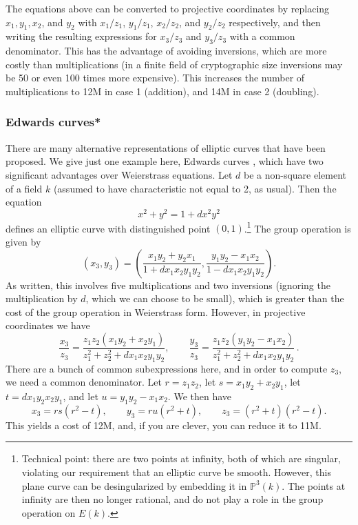 The equations above can be converted to projective coordinates by replacing $x_1,y_1,x_2$, and $y_2$ with
$x_1/z_1$, $y_1/z_1$, $x_2/z_2$, and $y_2/z_2$ respectively, and then writing the resulting expressions for $x_3/z_3$ and $y_3/z_3$ with a common denominator.
This has the advantage of avoiding inversions, which are more costly than multiplications (in a finite field of cryptographic size inversions may be 50 or even 100 times more expensive).
This increases the number of multiplications to 12M in case 1
(addition), and 14M in case 2 (doubling).

\subsubsection{Edwards curves*}
There are many alternative representations of elliptic curves that have been proposed.
We give just one example here, Edwards curves \cite{bl,edwards}, which have two significant advantages over Weierstrass equations.
Let $d$ be a non-square element of a field $k$ (assumed to have characteristic not equal to 2, as usual).
Then the equation
\begin{equation*}
x^2+y^2 = 1+dx^2y^2
\end{equation*}
defines an elliptic curve with distinguished point $(0,1)$.\footnote{Technical point: there are two points at infinity, both of which are singular,  violating our requirement that an elliptic curve be smooth.  However, this plane curve can be desingularized by embedding it in $\mathbb{P}^3(k)$.  The points at infinity are then no longer rational, and do not play a role in the group operation on $E(k)$.}
The group operation is given by
\begin{equation*}
(x_3,y_3)=\left(\frac{x_1y_2+y_2x_1}{1+dx_1x_2y_1y_2},\frac{y_1y_2-x_1x_2}{1-dx_1x_2y_1y_2}\right).
\end{equation*}
As written, this involves five multiplications and two inversions (ignoring the multiplication by $d$, which we can choose to be small),
which is greater than the cost of the group operation in Weierstrass form.
However, in projective coordinates we have
\begin{equation*}
\frac{x_3}{z_3}=\frac{z_1z_2(x_1y_2+x_2y_1)}{z_1^2+z_2^2+dx_1x_2y_1y_2},\qquad\frac{y_3}{z_3}=\frac{z_1z_2(y_1y_2-x_1x_2)}{z_1^2+z_2^2+dx_1x_2y_1y_2}\,.
\end{equation*}
There are a bunch of common subexpressions here, and in order to compute $z_3$, we need a common denominator.
Let $r=z_1z_2$, let $s=x_1y_2+x_2y_1$, let $t=dx_1y_2x_2y_1$, and let $u=y_1y_2-x_1x_2$.
We then have
\begin{equation*}
x_3=rs(r^2-t),\qquad y_3=ru(r^2+t),\qquad z_3=(r^2+t)(r^2-t).
\end{equation*}
This yields a cost of 12M, and, if you are clever, you can reduce it to 11M.

